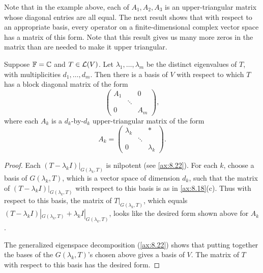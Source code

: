 Note that in the example above, each of $A_1,A_2,A_3$ is an upper-triangular
matrix whose diagonal entries are all equal. The next result shows that with
respect to an appropriate basis, every operator on a finite-dimensional complex
vector space has a matrix of this form. Note that this result gives us many
more zeros in the matrix than are needed to make it upper triangular.

\begin{result}\label{ax:8.37}
Suppose $\mathbb{F}=\mathbb{C}$ and $T\in\mathcal{L}(V)$. Let $\lambda_1,\dots,\lambda_m$ be the
distinct eigenvalues of $T$, with multiplicities $d_1,\dots,d_m$. Then there is
a basis of $V$ with respect to which $T$ has a block diagonal matrix of the
form
\[ \begin{pmatrix} A_1 & & 0\\ & \ddots & \\ 0 & & A_m \end{pmatrix}, \]
where each $A_k$ is a $d_k$-by-$d_k$ upper-triangular matrix of the form
\[ A_k = \begin{pmatrix} \lambda_k & & *\\ & \ddots & \\ 0 & & \lambda_k
   \end{pmatrix}. \]
\end{result}

\begin{proof}
Each $(T-\lambda_kI)|_{G(\lambda_k,T)}$ is nilpotent (see \ref{ax:8.22}). For
each $k$, choose a basis of $G(\lambda_k,T)$, which is a vector space of
dimension $d_k$, such that the matrix of $(T-\lambda_kI)|_{G(\lambda_k,T)}$
with respect to this basis is as in \ref{ax:8.18}(c). Thus with respect to this
basis, the matrix of $T|_{G(\lambda_k,T)}$, which equals
$(T-\lambda_kI)|_{G(\lambda_k,T)}+\lambda_kI|_{G(\lambda_k,T)}$, looks like the
desired form shown above for $A_k$.

The generalized eigenspace decomposition (\ref{ax:8.22}) shows that putting
together the bases of the $G(\lambda_k,T)$'s chosen above gives a basis of $V$.
The matrix of $T$ with respect to this basis has the desired form.
\end{proof}

